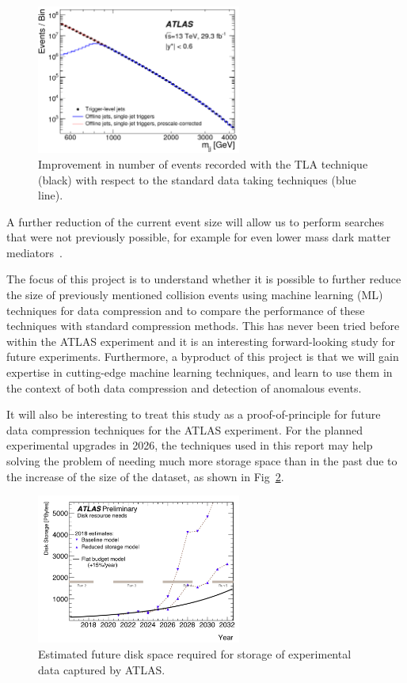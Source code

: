 \documentclass[11pt]{article}
\begin{document}
\begin{figure}[H]
\centering
\includegraphics[width=0.6\textwidth]{TLA.png}
\caption{Improvement in number of events recorded with the TLA technique (black) with respect to the standard data taking techniques (blue line).}
\label{TLA}
\end{figure}

A further reduction of the current event size will allow us to perform searches that were not previously possible, for example for even lower mass dark matter mediators~\cite{Chala2015}. 

The focus of this project is to understand whether it is possible to further reduce the size of previously mentioned collision events using machine learning (ML) techniques for data compression and to compare the performance of these techniques with standard compression methods. This has never been tried before within the ATLAS experiment and it is an interesting forward-looking study for future experiments. Furthermore, a byproduct of this project is that we will gain expertise in cutting-edge machine learning techniques, and learn to use them in the context of both data compression and detection of anomalous events. 

It will also be interesting to treat this study as a proof-of-principle for future data compression techniques for the ATLAS experiment. For the planned experimental upgrades in 2026, the techniques used in this report may help solving the problem of needing much more storage space than in the past due to the increase of the size of the dataset, as shown in Fig~\ref{diskHLLHC}.

\begin{figure}[H]
\centering
\includegraphics[width=0.6\textwidth]{diskHLLHC_noold.png}
\caption{Estimated future disk space required for storage of experimental data captured by ATLAS.}
\label{diskHLLHC}
\end{figure}
\end{document}
